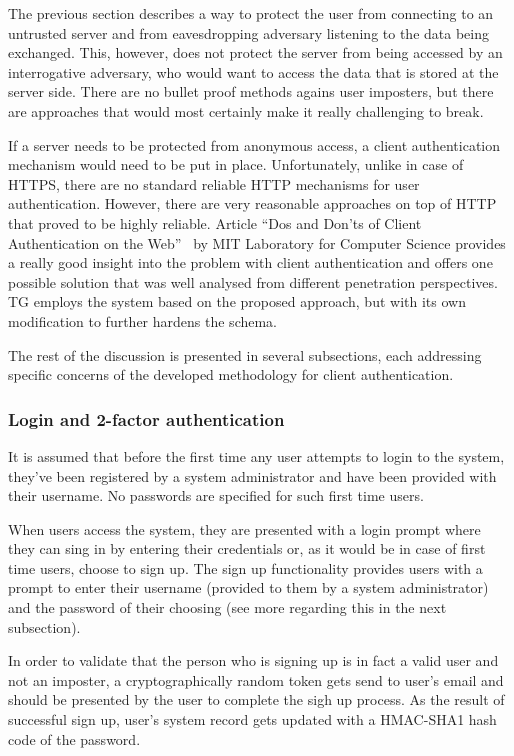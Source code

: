 \documentclass[a4paper,12pt,oneside,openright]{memoir}
\begin{document}
	The previous section describes a way to protect the user from connecting to an untrusted server and from eavesdropping adversary listening to the data being exchanged.
	This, however, does not protect the server from being accessed by an interrogative adversary, who would want to access the data that is stored at the server side.
	There are no bullet proof methods agains user imposters, but there are approaches that would most certainly make it really challenging to break.

	If a server needs to be protected from anonymous access, a client authentication mechanism would need to be put in place.
	Unfortunately, unlike in case of HTTPS, there are no standard reliable HTTP mechanisms for user authentication.
	However, there are very reasonable approaches on top of HTTP that proved to be highly reliable.
	Article ``Dos and Don’ts of Client Authentication on the Web''~\cite{MIT} by MIT Laboratory for Computer Science provides a really good insight into the problem with client authentication and offers one possible solution that was well analysed from different penetration perspectives.
	TG employs the system based on the proposed approach, but with its own modification to further hardens the schema.

	The rest of the discussion is presented in several subsections, each addressing specific concerns of the developed methodology for client authentication.

\subsubsection*{Login and 2-factor authentication}
	It is assumed that before the first time any user attempts to login to the system, they've been registered by a system administrator and have been provided with their username.
	No passwords are specified for such first time users.

	When users access the system, they are presented with a login prompt where they can sing in by entering their credentials or, as it would be in case of first time users, choose to sign up.
	The sign up functionality provides users with a prompt to enter their username (provided to them by a system administrator) and the password of their choosing (see more regarding this in the next subsection).

	In order to validate that the person who is signing up is in fact a valid user and not an imposter, a cryptographically random token gets send to user's email and should be presented by the user to complete the sigh up process.
	As the result of successful sign up, user's system record gets updated with a HMAC-SHA1 hash code of the password.
\end{document}
